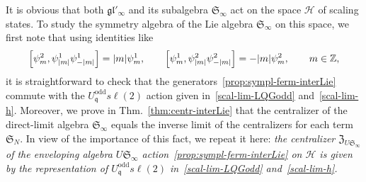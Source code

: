 \documentclass[11pt]{article}
\newcommand{\q}{\mathfrak{q}}
\newcommand{\JTL}[1]{JTL_{#1}}
\newcommand{\LQGodd}{U^{\text{odd}}_{\q} s\ell(2)}
\newcommand{\sfermp}{\psi^{2}}
\newcommand{\sfermm}{\psi^{1}}
\newcommand{\Hilb}{\mathcal{H}}
\newcommand{\oZ}{\mathbb{Z}}
\newcommand{\interLie}{\mathfrak{S}}
\newcommand{\interch}{\interLie}
\newcommand{\interfin}[1]{\interLie_{#1}}
\newcommand{\glinfc}{\gl'_{\infty}}
\newcommand{\interinfin}{\interLie_{\infty}}
\newcommand{\gl}{\mathfrak{gl}}
\newcommand{\cent}{\mathfrak{Z}}
\newcommand{\AppLim}{C}
\theoremstyle{definition}
\begin{document}
It is obvious that both $\glinfc$ and its subalgebra $\interinfin$ act on the space $\Hilb$ of scaling states.
To study the symmetry algebra of
the Lie algebra $\interinfin$ on this space, we first note that
using   identities like
\begin{equation}
\Bigl[\sfermp_m,\sfermm_{|m|}\sfermm_{-|m|}\Bigr]=|m|\sfermm_{m},\qquad
\Bigl[\sfermm_m,\sfermp_{|m|}\sfermp_{-|m|}\Bigr]=-|m|\sfermp_{m},\qquad
m\in\oZ,
\end{equation}
it is straightforward to check that the generators~\eqref{prop:sympl-ferm-interLie} commute with the $\LQGodd$ action given in~\eqref{scal-lim-LQGodd} and~\eqref{scal-lim-h}.
%
Moreover, we prove in Thm.~\ref{thm:centr-interLie} that the centralizer of the direct-limit algebra $\interinfin$ equals the inverse limit of the centralizers for each term $\interfin{N}$. In view of the importance of this fact, we repeat it here:
\textit{the centralizer $\cent_{U\interinfin}$ of the enveloping algebra $U\interinfin$ action~\eqref{prop:sympl-ferm-interLie} on $\Hilb$
 is given by the representation of $\LQGodd$ in~\eqref{scal-lim-LQGodd} and~\eqref{scal-lim-h}.}
\end{document}
